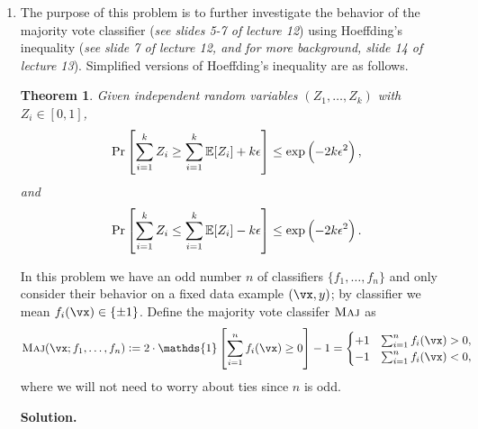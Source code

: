 \documentclass{article}
\def\eps{\epsilon}
\def\1{\mathds{1}}
\newtheorem{theorem}{Theorem}
\theoremstyle{definition}
\theoremstyle{remark}
\newenvironment{Q}
{%
\clearpage
\item
}
{%
\phantom{s} %
\bigskip
\textbf{Solution.}
}
\begin{document}
\begin{enumerate}[font={\Large\bfseries},left=0pt]
\begin{Q}
    
    The purpose of this problem is to further investigate the behavior of the majority vote classifier (\textit{see slides 5-7 of lecture 12}) using Hoeffding's inequality (\textit{see slide 7 of lecture 12, and for more background, slide 14 of lecture 13}).  Simplified versions of Hoeffding's inequality are as follows.
     \begin{theorem}\label{thm: hoeffding}
       Given independent random variables $(Z_1,\ldots,Z_k)$ with $Z_i \in [0,1]$,
         \begin{equation}\label{eq: hoeffding 1}
           \Pr\sbr{\sum_{i=1}^k Z_i \geq  \sum_{i=1}^k\mathbb{E}[Z_i] + k\eps } \leq \exp\del{-2k\eps^2},
         \end{equation}
         and
         \begin{equation}\label{eq: hoeffding 2}
           \Pr\sbr{\sum_{i=1}^k Z_i \leq  \sum_{i=1}^k\mathbb{E}[Z_i] - k\eps } \leq \exp\del{-2k\eps^2}.
         \end{equation}
     \end{theorem}

     In this problem we have an odd number $n$ of classifiers $\{f_1,\ldots,f_n\}$
     and only consider their behavior
     on a fixed data example $(\vx,y)$; by classifier we mean $f_i(\vx) \in \{\pm 1\}$.
     Define the majority vote classifer $\textsc{Maj}$ as
     \[
       \maj(\vx;f_1,\ldots,f_n)
       := 2\cdot \1\sbr{\sum_{i=1}^n f_i(\vx) \geq 0 } - 1
       = \begin{cases}
           +1 &\sum_{i=1}^n f_i(\vx) > 0, \\
           -1 &\sum_{i=1}^n f_i(\vx) < 0,
         \end{cases}
     \]
     where we will not need to worry about ties since $n$ is odd.


\end{Q}
\end{enumerate}
\end{document}

